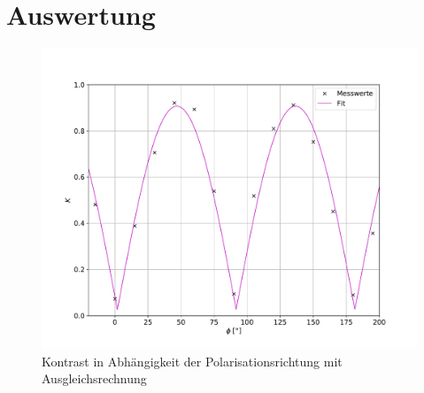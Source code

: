 \section{Auswertung}


\begin{figure}[H]
  \centering
  \includegraphics[width=\textwidth]{kontrast.pdf}
  \caption{Kontrast in Abhängigkeit der Polarisationsrichtung mit
  Ausgleichsrechnung}
  \label{fig:kontrast}
\end{figure}
